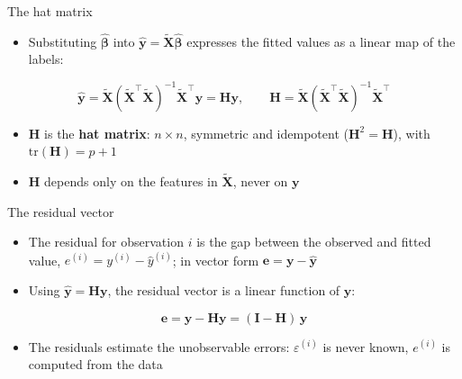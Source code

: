 \begin{frame}{The hat matrix}
    \begin{itemize}
        \item Substituting $\hat{\symbf{\beta}}$ into $\hat{\mathbf{y}} = \tilde{\mathbf{X}}\hat{\symbf{\beta}}$ expresses the fitted values as a linear map of the labels:
    \end{itemize}
    \[
        \hat{\mathbf{y}} = \tilde{\mathbf{X}} (\tilde{\mathbf{X}}^\top \tilde{\mathbf{X}})^{-1} \tilde{\mathbf{X}}^\top \mathbf{y} = \mathbf{H}\mathbf{y}, \qquad \mathbf{H} = \tilde{\mathbf{X}} (\tilde{\mathbf{X}}^\top \tilde{\mathbf{X}})^{-1} \tilde{\mathbf{X}}^\top
    \]
    \begin{itemize}
        \item $\mathbf{H}$ is the \textbf{hat matrix}: $n \times n$, symmetric and idempotent ($\mathbf{H}^2 = \mathbf{H}$), with $\mathrm{tr}(\mathbf{H}) = p+1$
        \item $\mathbf{H}$ depends only on the features in $\tilde{\mathbf{X}}$, never on $\mathbf{y}$
    \end{itemize}
\end{frame}


\begin{frame}{The residual vector}
    \begin{itemize}
        \item The residual for observation $i$ is the gap between the observed and fitted value, $e^{(i)} = y^{(i)} - \hat{y}^{(i)}$; in vector form $\mathbf{e} = \mathbf{y} - \hat{\mathbf{y}}$
        \item Using $\hat{\mathbf{y}} = \mathbf{H}\mathbf{y}$, the residual vector is a linear function of $\mathbf{y}$:
    \end{itemize}
    \[
        \mathbf{e} = \mathbf{y} - \mathbf{H}\mathbf{y} = (\mathbf{I} - \mathbf{H})\,\mathbf{y}
    \]
    \begin{itemize}
        \item The residuals estimate the unobservable errors: $\varepsilon^{(i)}$ is never known, $e^{(i)}$ is computed from the data
    \end{itemize}
\end{frame}


